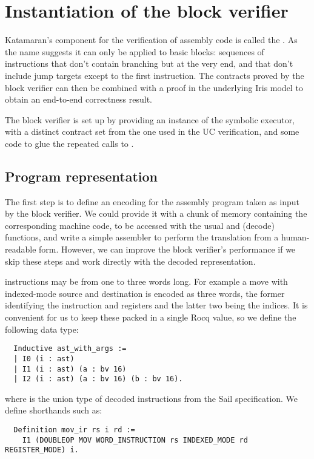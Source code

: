\section{Instantiation of the block verifier}

Katamaran's component for the verification of assembly code is called the . As the name suggests it can only be applied to basic blocks: sequences of instructions that don't contain branching but at the very end, and that don't include jump targets except to the first instruction. The contracts proved by the block verifier can then be combined with a proof in the underlying Iris model to obtain an end-to-end correctness result.

The block verifier is set up by providing an instance of the symbolic executor,
with a distinct contract set from the one used in the UC verification, and some code to glue the repeated calls to .

\subsection{Program representation}
\label{sec:program-representation}

The first step is to define an encoding for the assembly program taken as input by the block verifier. We could provide it with a chunk of memory containing the corresponding machine code, to be accessed with the usual  and  (decode) functions, and write a simple assembler to perform the translation from a human-readable form. However, we can improve the block verifier's performance if we skip these steps and work directly with the decoded representation.

\msp instructions may be from one to three words long. For example a move with indexed-mode source and destination is encoded as three words, the former identifying the instruction and registers and the latter two being the indices. It is convenient for us to keep these packed in a single Rocq value, so we define the following data type:
\begin{verbatim}
  Inductive ast_with_args :=
  | I0 (i : ast)
  | I1 (i : ast) (a : bv 16)
  | I2 (i : ast) (a : bv 16) (b : bv 16).
\end{verbatim}
where  is the union type of decoded instructions from the Sail specification. We define shorthands such as:
\begin{verbatim}
  Definition mov_ir rs i rd :=
    I1 (DOUBLEOP MOV WORD_INSTRUCTION rs INDEXED_MODE rd REGISTER_MODE) i.
\end{verbatim}

